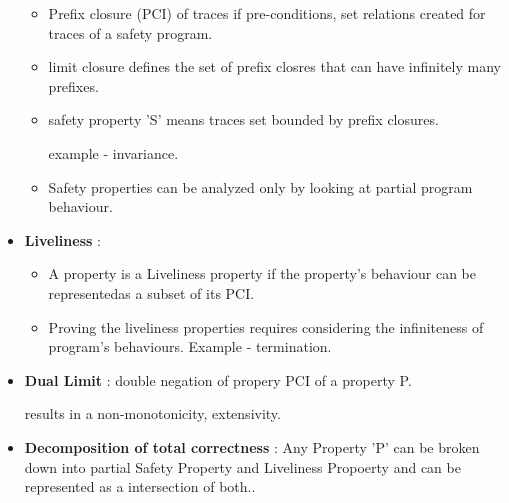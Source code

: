 \begin{itemize}
{\begin{itemize}
			\item{ Prefix closure (PCI) of traces if pre-conditions, set relations created for traces of a safety program.
			}

			\item{limit closure defines the set of prefix closres that can have infinitely many prefixes.
			}

			\item{ safety property 'S' means traces set bounded by prefix closures. 

			example - invariance.

			}

			\item{Safety properties can be analyzed only by looking at partial program behaviour.
			}

		\end{itemize}

	}

	\item{\textbf{Liveliness} :

		\begin{itemize}
			\item{ A property is a Liveliness property if the property's behaviour can be representedas a subset of its PCI.
			}

			\item{Proving the liveliness properties requires considering the infiniteness of program's behaviours.
			Example - termination.
			}
		\end{itemize}

	}

	\item{\textbf{Dual Limit} : double negation of propery PCI of a property P.

	results in a non-monotonicity, extensivity.
	}

	\item{\textbf{Decomposition of total correctness} :
	Any Property 'P' can be broken down into partial Safety Property and Liveliness Propoerty and can be represented as a intersection of both..
	}

	
\end{itemize}
